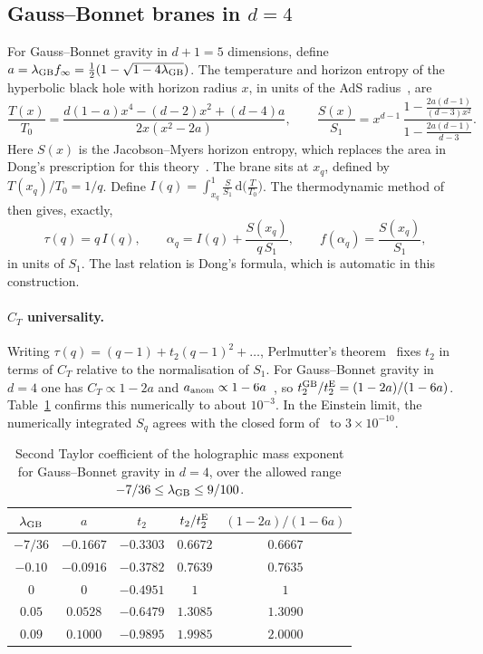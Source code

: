 \documentclass[11pt]{article}
\theoremstyle{definition}\newtheorem{definition}{Definition}[section]
\theoremstyle{remark}\newtheorem*{remark}{Remark}
\newcommand{\dd}{\mathrm{d}}
\begin{document}
\subsection{Gauss--Bonnet branes in $d=4$}
For Gauss--Bonnet gravity in $d+1=5$ dimensions, define $a=\lambda_{\rm GB}f_\infty=\frac12(1-\sqrt{1-4\lambda_{\rm GB}})$.
The temperature and horizon entropy of the hyperbolic black hole with horizon radius $x$, in units of the AdS
radius~\cite{Cai}, are
\begin{equation}
\frac{T(x)}{T_0}=\frac{d(1-a)x^4-(d-2)x^2+(d-4)a}{2x(x^2-2a)},\qquad
\frac{S(x)}{S_1}=x^{d-1}\,\frac{1-\frac{2a(d-1)}{(d-3)x^2}}{1-\frac{2a(d-1)}{d-3}} .
\end{equation}
Here $S(x)$ is the Jacobson--Myers horizon entropy, which replaces the area in Dong's prescription for this
theory~\cite{DongHD}. The brane sits at $x_q$, defined by $T(x_q)/T_0=1/q$. Define
$I(q)=\int_{x_q}^{1}\frac{S}{S_1}\,\dd\big(\frac{T}{T_0}\big)$. The thermodynamic method of~\cite{HMSY} then gives, exactly,
\begin{equation}
\tau(q)=q\,I(q),\qquad \alpha_q=I(q)+\frac{S(x_q)}{q\,S_1},\qquad f(\alpha_q)=\frac{S(x_q)}{S_1},
\end{equation}
in units of $S_1$. The last relation is Dong's formula, which is automatic in this construction.

\paragraph{$C_T$ universality.} Writing $\tau(q)=(q-1)+t_2(q-1)^2+\dots$, Perlmutter's theorem~\cite{Perlmutter}
fixes $t_2$ in terms of $C_T$ relative to the normalisation of $S_1$. For Gauss--Bonnet gravity in $d=4$ one has
$C_T\propto1-2a$ and $a_{\rm anom}\propto1-6a$~\cite{MyersSinha}, so
$t_2^{\rm GB}/t_2^{\rm E}=(1-2a)/(1-6a)$. Table~\ref{tab:gb} confirms this numerically to about $10^{-3}$. In the
Einstein limit, the numerically integrated $S_q$ agrees with the closed form of~\cite{HMSY} to
$3\times10^{-10}$.

\begin{table}[htbp]
\centering
\begin{tabular}{ccccc}
\toprule
$\lambda_{\rm GB}$ & $a$ & $t_2$ & $t_2/t_2^{\rm E}$ & $(1-2a)/(1-6a)$\\
\midrule
$-7/36$ & $-0.1667$ & $-0.3303$ & $0.6672$ & $0.6667$\\
$-0.10$ & $-0.0916$ & $-0.3782$ & $0.7639$ & $0.7635$\\
$0$ & $0$ & $-0.4951$ & $1$ & $1$\\
$0.05$ & $0.0528$ & $-0.6479$ & $1.3085$ & $1.3090$\\
$0.09$ & $0.1000$ & $-0.9895$ & $1.9985$ & $2.0000$\\
\bottomrule
\end{tabular}
\caption{Second Taylor coefficient of the holographic mass exponent for Gauss--Bonnet gravity in $d=4$,
over the allowed range $-7/36\le\lambda_{\rm GB}\le9/100$.}
\label{tab:gb}
\end{table}
\end{document}
